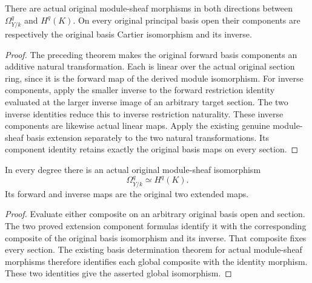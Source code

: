 \begin{definition}
\label{def:cartier-geometric-global-sheaf-maps}
\leanok
There are actual original module-sheaf morphisms in both directions
between $\Omega^q_{Y/k}$ and $H^q(K)$. On every original principal
basis open their components are respectively the original basis
Cartier isomorphism and its inverse.
\end{definition}
\begin{proof}
The preceding theorem makes the original forward basis components
an additive natural transformation. Each is linear over the actual
original section ring, since it is the forward map of the derived
module isomorphism. For inverse components, apply the smaller
inverse to the forward restriction identity evaluated at the
larger inverse image of an arbitrary target section. The two
inverse identities reduce this to inverse restriction naturality.
These inverse components are likewise actual linear maps. Apply
the existing genuine module-sheaf basis extension separately to
the two natural transformations. Its component identity retains
exactly the original basis maps on every section.
\end{proof}

\begin{theorem}
\label{thm:cartier-geometric-global-sheaf-isomorphism}
\leanok
In every degree there is an actual original module-sheaf
isomorphism
\[\Omega^q_{Y/k}\simeq H^q(K).\]
Its forward and inverse maps are the original two extended maps.
\end{theorem}
\begin{proof}
Evaluate either composite on an arbitrary original basis open and
section. The two proved extension component formulas identify it
with the corresponding composite of the original basis
isomorphism and its inverse. That composite fixes every section.
The existing basis determination theorem for actual module-sheaf
morphisms therefore identifies each global composite with the
identity morphism. These two identities give the asserted global
isomorphism.
\end{proof}

